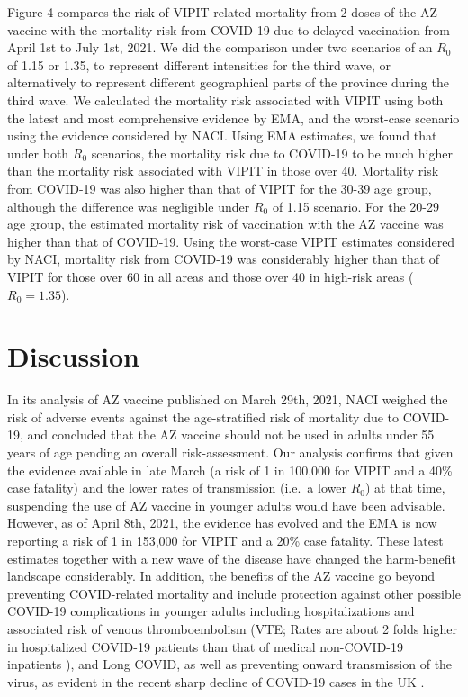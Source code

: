 \documentclass[]{interact}
\theoremstyle{plain}%
\theoremstyle{definition}
\theoremstyle{remark}
\begin{document}
Figure 4 compares the risk of VIPIT-related mortality from 2 doses of
the AZ vaccine with the mortality risk from COVID-19 due to delayed
vaccination from April 1st to July 1st, 2021. We did the comparison
under two scenarios of an \(R_0\) of 1.15 or 1.35, to represent
different intensities for the third wave, or alternatively to represent
different geographical parts of the province during the third wave. We
calculated the mortality risk associated with VIPIT using both the
latest and most comprehensive evidence by EMA, and the worst-case
scenario using the evidence considered by NACI. Using EMA estimates, we
found that under both \(R_0\) scenarios, the mortality risk due to
COVID-19 to be much higher than the mortality risk associated with VIPIT
in those over 40. Mortality risk from COVID-19 was also higher than that
of VIPIT for the 30-39 age group, although the difference was negligible
under \(R_0\) of 1.15 scenario. For the 20-29 age group, the estimated
mortality risk of vaccination with the AZ vaccine was higher than that
of COVID-19. Using the worst-case VIPIT estimates considered by NACI,
mortality risk from COVID-19 was considerably higher than that of VIPIT
for those over 60 in all areas and those over 40 in high-risk areas
(\(R_0=1.35\)).

\hypertarget{discussion}{%
\section{Discussion}\label{discussion}}

In its analysis of AZ vaccine published on March 29th, 2021, NACI
weighed the risk of adverse events against the age-stratified risk of
mortality due to COVID-19, and concluded that the AZ vaccine should not
be used in adults under 55 years of age pending an overall
risk-assessment. Our analysis confirms that given the evidence available
in late March (a risk of 1 in 100,000 for VIPIT and a 40\% case
fatality) and the lower rates of transmission (i.e.~a lower \(R_0\)) at
that time, suspending the use of AZ vaccine in younger adults would have
been advisable. However, as of April 8th, 2021, the evidence has evolved
and the EMA is now reporting a risk of 1 in 153,000 for VIPIT and a 20\%
case fatality. These latest estimates together with a new wave of the
disease have changed the harm-benefit landscape considerably. In
addition, the benefits of the AZ vaccine go beyond preventing
COVID-related mortality and include protection against other possible
COVID-19 complications in younger adults including hospitalizations and
associated risk of venous thromboembolism (VTE; Rates are about 2 folds
higher in hospitalized COVID-19 patients than that of medical
non-COVID-19 inpatients \citep{alberta_health_services_covid-19_2021}),
and Long COVID, as well as preventing onward transmission of the virus,
as evident in the recent sharp decline of COVID-19 cases in the UK
\citep{govuk_official_2021}.
\end{document}
